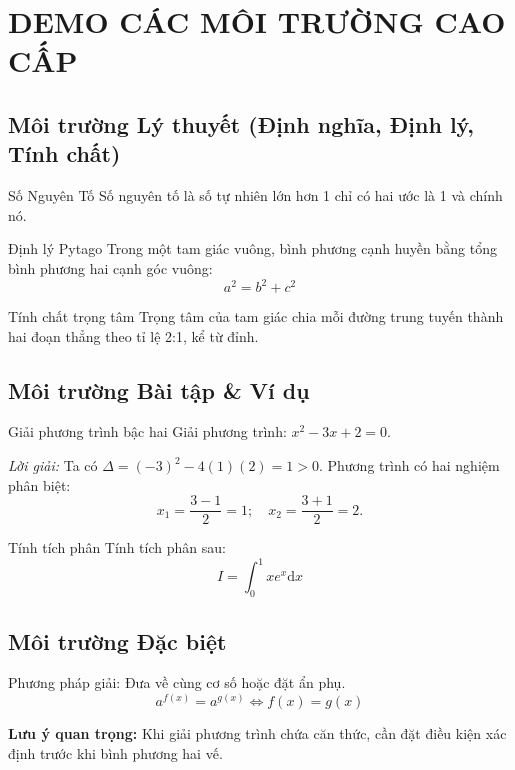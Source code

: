 \documentclass[12pt,a4paper]{article}
\begin{document}
\section{DEMO CÁC MÔI TRƯỜNG CAO CẤP}
\subsection{Môi trường Lý thuyết (Định nghĩa, Định lý, Tính chất)}

\begin{dn}{Số Nguyên Tố}{}
    Số nguyên tố là số tự nhiên lớn hơn 1 chỉ có hai ước là 1 và chính nó.
\end{dn}

\begin{dl}{Định lý Pytago}{}
    Trong một tam giác vuông, bình phương cạnh huyền bằng tổng bình phương hai cạnh góc vuông:
    \[ a^2 = b^2 + c^2 \]
\end{dl}

\begin{tc}{Tính chất trọng tâm}{}
    Trọng tâm của tam giác chia mỗi đường trung tuyến thành hai đoạn thẳng theo tỉ lệ 2:1, kể từ đỉnh.
\end{tc}

\subsection{Môi trường Bài tập & Ví dụ}

\begin{vd}{Giải phương trình bậc hai}{}
    Giải phương trình: $x^2 - 3x + 2 = 0$.
    
    \textit{Lời giải:}
    Ta có $\Delta = (-3)^2 - 4(1)(2) = 1 > 0$.
    Phương trình có hai nghiệm phân biệt:
    \[ x_1 = \frac{3-1}{2} = 1; \quad x_2 = \frac{3+1}{2} = 2. \]
\end{vd}

\begin{bt}{Tính tích phân}{}
    Tính tích phân sau:
    \[ I = \int_0^1 x e^x \mathrm{d}x \]
\end{bt}

\subsection{Môi trường Đặc biệt}

\begin{dang}
    Phương pháp giải: Đưa về cùng cơ số hoặc đặt ẩn phụ.
    \[ a^{f(x)} = a^{g(x)} \Leftrightarrow f(x) = g(x) \]
\end{dang}

\begin{note}
    \textbf{Lưu ý quan trọng:}
    Khi giải phương trình chứa căn thức, cần đặt điều kiện xác định trước khi bình phương hai vế.
\end{note}
\end{document}
